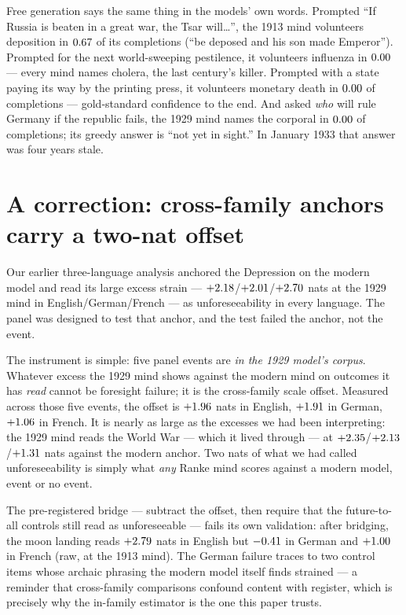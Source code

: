 \documentclass[11pt]{article}
\begin{document}
Free generation says the same thing in the models' own words. Prompted ``If Russia is beaten in a great
war, the Tsar will\dots'', the 1913 mind volunteers deposition in $0.67$ of its completions
(``be deposed and his son made Emperor''). Prompted for the next world-sweeping pestilence, it volunteers
influenza in $0.00$ --- every mind names cholera, the last century's killer. Prompted with a
state paying its way by the printing press, it volunteers monetary death in $0.00$ of
completions --- gold-standard confidence to the end. And asked \emph{who} will rule Germany if the republic
fails, the 1929 mind names the corporal in $0.00$ of completions; its greedy answer is ``not yet
in sight.'' In January 1933 that answer was four years stale.

\section{A correction: cross-family anchors carry a two-nat offset}\label{sec:bridge}

Our earlier three-language analysis anchored the Depression on the modern model and read its large excess
strain --- $+2.18$/$+2.01$/$+2.70$ nats at the 1929 mind in English/German/French --- as
unforeseeability in every language. The panel was designed to test that anchor, and the test failed the
anchor, not the event.

The instrument is simple: five panel events are \emph{in the 1929 model's corpus}. Whatever excess the 1929
mind shows against the modern mind on outcomes it has \emph{read} cannot be foresight failure; it is the
cross-family scale offset. Measured across those five events, the offset is $+1.96$ nats in
English, $+1.91$ in German, $+1.06$ in French. It is nearly as large as the excesses we had
been interpreting: the 1929 mind reads the World War --- which it lived through --- at
$+2.35$/$+2.13$/$+1.31$ nats against the modern anchor. Two nats of what we had
called unforeseeability is simply what \emph{any} Ranke mind scores against a modern model, event or no
event.

The pre-registered bridge --- subtract the offset, then require that the future-to-all controls still read
as unforeseeable --- fails its own validation: after bridging, the moon landing reads $+2.79$ nats in
English but $-0.41$ in German and $+1.00$ in French (raw, at the 1913 mind). The German
failure traces to two control items whose archaic phrasing the modern model itself finds strained --- a
reminder that cross-family comparisons confound content with register, which is precisely why the in-family
estimator is the one this paper trusts.
\end{document}
